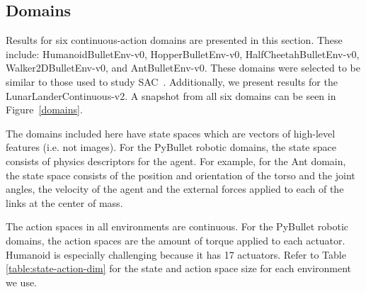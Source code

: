 \documentclass{article}
\begin{document}

        \subsection{Domains}
            Results for six continuous-action domains are presented in this section. These include: HumanoidBulletEnv-v0, HopperBulletEnv-v0, HalfCheetahBulletEnv-v0, Walker2DBulletEnv-v0, and AntBulletEnv-v0. 
            These domains were selected to be similar to those used to study SAC~\cite{haarnoja2018soft}. 
            Additionally, we present results for the LunarLanderContinuous-v2. %
            A snapshot from all six domains can be seen in Figure~\ref{domains}.



            The domains included here have state spaces which are vectors of high-level features (i.e. not images). For the PyBullet robotic domains, the state space consists of physics descriptors for the agent. For example, for the Ant domain, the state space consists of the position and orientation of the torso and the joint angles, the velocity of the agent and the external forces applied to each of the links at the center of mass.

            The action spaces in all environments are continuous. For the PyBullet robotic domains, the action spaces are the amount of torque applied to each actuator. Humanoid is especially challenging because it has 17 actuators. Refer to Table \ref{table:state-action-dim} for the state and action space size for each environment we use.
\end{document}
